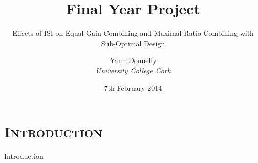 \documentclass[xcolor=x11names,compress]{beamer}
\renewcommand{\(}{\begin{columns}}
\renewcommand{\)}{\end{columns}}
\newcommand{\<}[1]{\begin{column}{#1}}
\renewcommand{\>}{\end{column}}
\begin{document}
\section{\scshape Introduction}
\begin{frame}
\title{Final Year Project}
\subtitle{Effects of ISI on Equal Gain Combining and Maximal-Ratio Combining with Sub-Optimal Design}
\author{
	Yann Donnelly\\
	{\it University College Cork}\\
}
\date{
	\vspace{1cm}
	7th February 2014
}
\titlepage
\end{frame}


\begin{frame}{Introduction}
\tableofcontents
\end{frame}

\end{document}
